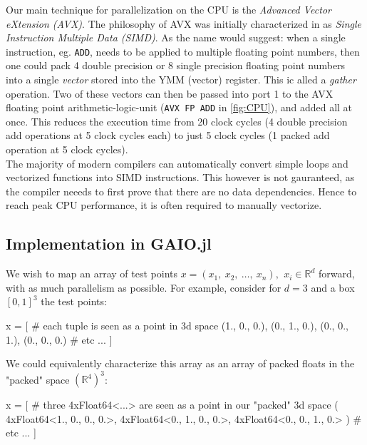 Our main technique for parallelization on the CPU is the 
\emph{Advanced Vector eXtension (AVX)}. The philosophy of AVX was initially characterized 
in \cite*{simd} as \emph{Single Instruction Multiple Data (SIMD)}. As the name would 
suggest: when a single instruction, eg. \texttt{ADD}, needs to be applied to multiple 
floating point numbers, then one could pack 4 double precision or 8 single precision 
floating point numbers into a single \emph{vector} stored into the YMM (vector) register. 
This ic alled a \emph{gather} operation.
Two of these vectors can then be passed into port 1 to the AVX floating point 
arithmetic-logic-unit (\texttt{AVX FP ADD} in \autoref{fig:CPU}), and added all at once. 
This reduces the execution time from 20 clock cycles (4 double precision add operations at 
5 clock cycles each) to just 5 clock cycles (1 packed add operation at 5 clock cycles). \\

The majority of modern compilers can automatically convert simple loops and vectorized 
functions into SIMD instructions. This however is not gauranteed, as the compiler neeeds 
to first prove that there are no data dependencies. Hence to reach peak CPU performance, 
it is often required to manually vectorize. 


\subsection{Implementation in GAIO.jl}

We wish to map an array of test points 
$x = (x_1,\ x_2,\ \ldots,\ x_n),\,\ x_i \in \mathbb{R}^d$ forward, with as much 
parallelism as possible. For example, consider for $d=3$ and a box $[0,1]^3$ the test 
points:

\begin{jllisting}[language=julia, style=jlcodestyle]
    x = [   # each tuple is seen as a point in 3d space
        (1., 0., 0.),
        (0., 1., 0.),
        (0., 0., 1.),
        (0., 0., 0.)
        # etc ...
    ]
\end{jllisting}

We could equivalently characterize this array as an array of packed floats in 
the "packed" space $(\mathbb{R}^4)^3$:

\begin{jllisting}[language=julia, style=jlcodestyle]
    x = [   # three 4xFloat64<...> are seen as a point in our "packed" 3d space
        (
            4xFloat64<1., 0., 0., 0.>, 
            4xFloat64<0., 1., 0., 0.>, 
            4xFloat64<0., 0., 1., 0.>
        )
        # etc ...
    ]
\end{jllisting}

